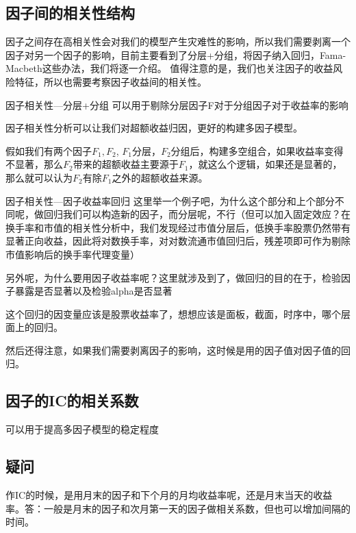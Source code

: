 \documentclass[12pt]{article}
\theoremstyle{definition}
\begin{document}
\subsection{因子间的相关性结构}
因子之间存在高相关性会对我们的模型产生灾难性的影响，所以我们需要剥离一个因子对另一个因子的影响，目前主要看到了分层+分组，将因子纳入回归，Fama-Macbeth这些办法，我们将逐一介绍。
值得注意的是，我们也关注因子的收益风险特征，所以也需要考察因子收益间的相关性。
\begin{sdefinition}{因子相关性—分层+分组}{}
可以用于剔除分层因子F对于分组因子对于收益率的影响
\end{sdefinition}
因子相关性分析可以让我们对超额收益归因，更好的构建多因子模型。
\begin{sremark}{}{}
假如我们有两个因子$F_1,F_2$, $F_1$分层，$F_2$分组后，构建多空组合，如果收益率变得不显著，那么$F_2$带来的超额收益主要源于$F_1$，就这么个逻辑，如果还是显著的，那么就可以认为$F_2$有除$F_1$之外的超额收益来源。
\end{sremark}



\begin{sdefinition}{因子相关性—因子收益率回归}{}
这里举一个例子吧，为什么这个部分和上个部分不同呢，做回归我们可以构造新的因子，而分层呢，不行（但可以加入固定效应？在换手率和市值的相关性分析中，我们发现经过市值分层后，低换手率股票仍然带有显著正向收益，因此将对数换手率，对对数流通市值回归后，残差项即可作为剔除市值影响后的换手率代理变量）
\end{sdefinition}
另外呢，为什么要用因子收益率呢？这里就涉及到了，做回归的目的在于，检验因子暴露是否显著以及检验alpha是否显著
\begin{sremark}{}{}
这个回归的因变量应该是股票收益率了，想想应该是面板，截面，时序中，哪个层面上的回归。
\end{sremark}
\begin{sremark}{}{}
然后还得注意，如果我们需要剥离因子的影响，这时候是用的因子值对因子值的回归。
\end{sremark}

\subsection{因子的IC的相关系数}
可以用于提高多因子模型的稳定程度 
\subsection{疑问}
作IC的时候，是用月末的因子和下个月的月均收益率呢，还是月末当天的收益率。答：一般是月末的因子和次月第一天的因子做相关系数，但也可以增加间隔的时间。
\end{document}
